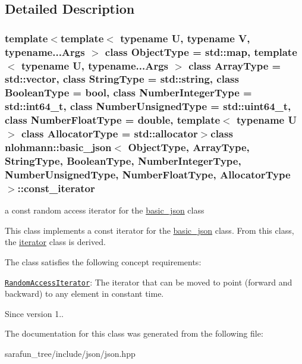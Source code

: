 \subsection{Detailed Description}
\subsubsection*{template$<$template$<$ typename U, typename V, typename...\-Args $>$ class Object\-Type = std\-::map, template$<$ typename U, typename...\-Args $>$ class Array\-Type = std\-::vector, class String\-Type = std\-::string, class Boolean\-Type = bool, class Number\-Integer\-Type = std\-::int64\-\_\-t, class Number\-Unsigned\-Type = std\-::uint64\-\_\-t, class Number\-Float\-Type = double, template$<$ typename U $>$ class Allocator\-Type = std\-::allocator$>$class nlohmann\-::basic\-\_\-json$<$ Object\-Type, Array\-Type, String\-Type, Boolean\-Type, Number\-Integer\-Type, Number\-Unsigned\-Type, Number\-Float\-Type, Allocator\-Type $>$\-::const\-\_\-iterator}

a const random access iterator for the \hyperlink{classnlohmann_1_1basic__json}{basic\-\_\-json} class 

This class implements a const iterator for the \hyperlink{classnlohmann_1_1basic__json}{basic\-\_\-json} class. From this class, the \hyperlink{classnlohmann_1_1basic__json_1_1iterator}{iterator} class is derived.

The class satisfies the following concept requirements\-:
\begin{DoxyItemize}
\item \href{http://en.cppreference.com/w/cpp/concept/RandomAccessIterator}{\tt Random\-Access\-Iterator}\-: The iterator that can be moved to point (forward and backward) to any element in constant time.
\end{DoxyItemize}

\begin{DoxySince}{Since}
version 1.. 
\end{DoxySince}


The documentation for this class was generated from the following file\-:\begin{DoxyCompactItemize}
\item 
sarafun\-\_\-tree/include/json/json.\-hpp\end{DoxyCompactItemize}
